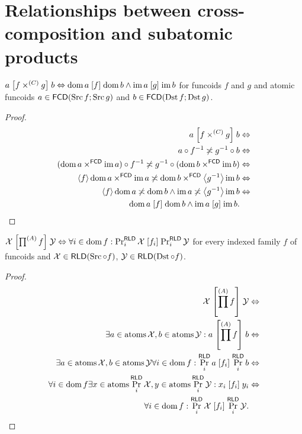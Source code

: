 \section[Cross-composition and subatomic products]{Relationships between cross-composition and subatomic products}
\begin{prop}
$a\mathrel{\left[f\times^{(C)}g\right]}b\Leftrightarrow\operatorname{dom} a\mathrel{\left[f\right]}\operatorname{dom} b\wedge\operatorname{im} a\mathrel{\left[g\right]}\operatorname{im} b$
for funcoids $f$ and $g$ and atomic funcoids $a\in\mathsf{FCD}(\operatorname{Src} f;\operatorname{Src} g)$
and $b\in\mathsf{FCD}(\operatorname{Dst} f;\operatorname{Dst} g)$.\end{prop}
\begin{proof}
~
\begin{align*}
a\mathrel{\left[f\times^{(C)}g\right]}b & \Leftrightarrow\\
a\circ f^{-1}\not\asymp g^{-1}\circ b & \Leftrightarrow\\
(\operatorname{dom} a\times^{\mathsf{FCD}}\operatorname{im} a)\circ f^{-1}\not\asymp g^{-1}\circ(\operatorname{dom} b\times^{\mathsf{FCD}}\operatorname{im} b) & \Leftrightarrow\\
\left\langle f\right\rangle\operatorname{dom} a\times^{\mathsf{FCD}}\operatorname{im} a\not\asymp\operatorname{dom} b\times^{\mathsf{FCD}}\left\langle g^{-1}\right\rangle\operatorname{im} b & \Leftrightarrow\\
\left\langle f\right\rangle\operatorname{dom} a\not\asymp\operatorname{dom} b\land\operatorname{im} a\not\asymp\left\langle g^{-1}\right\rangle\operatorname{im} b & \Leftrightarrow\\
\operatorname{dom} a\mathrel{\left[f\right]}\operatorname{dom} b\wedge\operatorname{im} a\mathrel{\left[g\right]}\operatorname{im} b.
\end{align*}
\end{proof}
\begin{prop}
$\mathcal{X}\mathrel{\left[\prod^{(A)}f\right]}\mathcal{Y}\Leftrightarrow\forall i\in\operatorname{dom} f:\Pr_{i}^{\mathsf{RLD}}\mathcal{X}\mathrel{\left[f_{i}\right]}\Pr_{i}^{\mathsf{RLD}}\mathcal{Y}$
for every indexed family $f$ of funcoids and $\mathcal{X}\in\mathsf{RLD}(\operatorname{Src}\circ f)$,
$\mathcal{Y}\in\mathsf{RLD}(\operatorname{Dst}\circ f)$.\end{prop}
\begin{proof}
~
\begin{align*}
\mathcal{X}\mathrel{\left[\prod^{(A)}f\right]}\mathcal{Y} & \Leftrightarrow\\
\exists a\in\operatorname{atoms}\mathcal{X},b\in\operatorname{atoms}\mathcal{Y}:a\mathrel{\left[\prod^{(A)}f\right]}b & \Leftrightarrow\\
\exists a\in\operatorname{atoms}\mathcal{X},b\in\operatorname{atoms}\mathcal{Y}\forall i\in\operatorname{dom} f:\Pr_{i}^{\mathsf{RLD}}a\mathrel{\left[f_{i}\right]}\Pr_{i}^{\mathsf{RLD}}b & \Leftrightarrow\\
\forall i\in\operatorname{dom} f\exists x\in\operatorname{atoms}\Pr_{i}^{\mathsf{RLD}}\mathcal{X},y\in\operatorname{atoms}\Pr_{i}^{\mathsf{RLD}}\mathcal{Y}:x_{i}\mathrel{\left[f_{i}\right]}y_{i} & \Leftrightarrow\\
\forall i\in\operatorname{dom} f:\Pr_{i}^{\mathsf{RLD}}\mathcal{X}\mathrel{\left[f_{i}\right]}\Pr_{i}^{\mathsf{RLD}}\mathcal{Y}.
\end{align*}
\end{proof}
